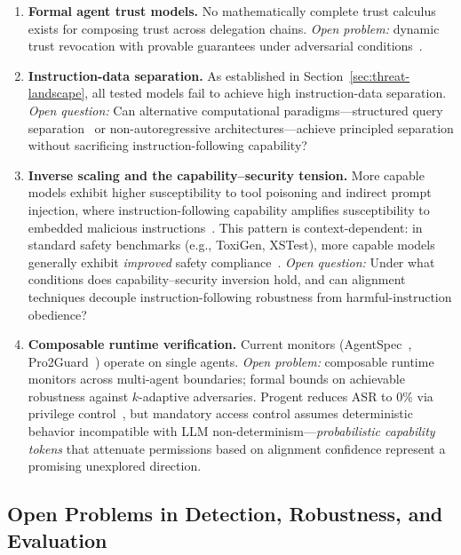 \begin{enumerate}[nosep,leftmargin=1.5em]
    \item \textbf{Formal agent trust models.} No mathematically complete trust calculus exists for composing trust across delegation chains. \emph{Open problem:} dynamic trust revocation with provable guarantees under adversarial conditions~\cite{trustparadox2025}.
    \item \textbf{Instruction-data separation.} As established in Section~\ref{sec:threat-landscape}, all tested models fail to achieve high instruction-data separation. \emph{Open question:} Can alternative computational paradigms---structured query separation~\cite{chen2025struq} or non-autoregressive architectures---achieve principled separation without sacrificing instruction-following capability?
    \item \textbf{Inverse scaling and the capability--security tension.} More capable models exhibit higher susceptibility to tool poisoning and indirect prompt injection, where instruction-following capability amplifies susceptibility to embedded malicious instructions~\cite{wang2025mcptox,yi2025bipia}. This pattern is context-dependent: in standard safety benchmarks (e.g., ToxiGen, XSTest), more capable models generally exhibit \emph{improved} safety compliance~\cite{rottger2024xstest}. \emph{Open question:} Under what conditions does capability--security inversion hold, and can alignment techniques decouple instruction-following robustness from harmful-instruction obedience?
    \item \textbf{Composable runtime verification.} Current monitors (AgentSpec~\cite{wang2025agentspec}, Pro2Guard~\cite{pro2guard2025}) operate on single agents. \emph{Open problem:} composable runtime monitors across multi-agent boundaries; formal bounds on achievable robustness against $k$-adaptive adversaries. Progent reduces ASR to 0\% via privilege control~\cite{shi2025progent}, but mandatory access control assumes deterministic behavior incompatible with LLM non-determinism---\emph{probabilistic capability tokens} that attenuate permissions based on alignment confidence represent a promising unexplored direction.
\end{enumerate}


\subsection{Open Problems in Detection, Robustness, and Evaluation}
\label{sec:future-open}

